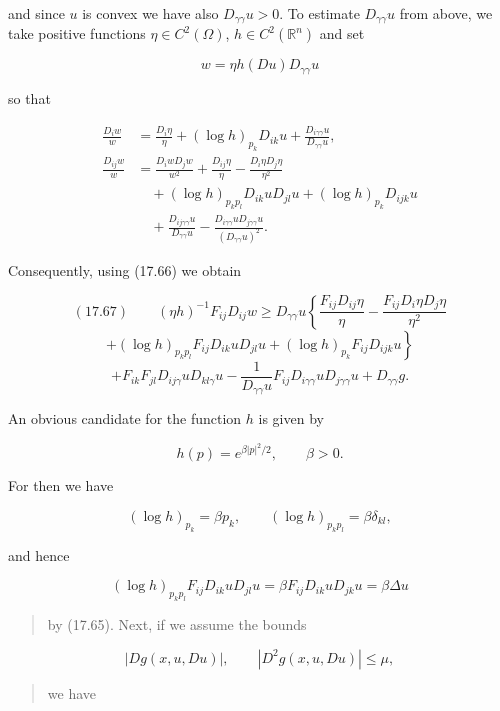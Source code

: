 and since $u$ is convex we have also $D_{\gamma\gamma}u > 0$. To estimate $D_{\gamma\gamma}u$ from above, we take positive functions $\eta\in C^2(\Omega)$, $h\in C^2(\mathbb{R}^n)$ and set

\[
w=\eta h(Du)D_{\gamma\gamma}u
\]

so that

\begin{align*}
\frac{D_iw}{w} &= \frac{D_i\eta}{\eta} + (\log h)_{p_k}D_{ik}u + \frac{D_{i\gamma\gamma}u}{D_{\gamma\gamma}u},\\
\frac{D_{ij}w}{w} &= \frac{D_iwD_jw}{w^2} + \frac{D_{ij}\eta}{\eta} - \frac{D_i\eta D_j\eta}{\eta^2}\\
&\quad + (\log h)_{p_kp_l}D_{ik}uD_{jl}u + (\log h)_{p_k}D_{ijk}u\\
&\quad + \frac{D_{ij\gamma\gamma}u}{D_{\gamma\gamma}u} - \frac{D_{i\gamma\gamma}uD_{j\gamma\gamma}u}{(D_{\gamma\gamma}u)^2}.
\end{align*}

Consequently, using (17.66) we obtain

\begin{equation}
(17.67)\qquad (\eta h)^{-1}F_{ij}D_{ij}w \ge D_{\gamma\gamma}u\left\{\frac{F_{ij}D_{ij}\eta}{\eta} - \frac{F_{ij}D_i\eta D_j\eta}{\eta^2}\right.
\end{equation}
\[
\left.
+ (\log h)_{p_kp_l}F_{ij}D_{ik}uD_{jl}u + (\log h)_{p_k}F_{ij}D_{ijk}u\right\}
\]
\[
+ F_{ik}F_{jl}D_{ij\gamma}uD_{kl\gamma}u - \frac{1}{D_{\gamma\gamma}u}F_{ij}D_{i\gamma\gamma}uD_{j\gamma\gamma}u + D_{\gamma\gamma}g.
\]

An obvious candidate for the function $h$ is given by

\[
h(p)=e^{\beta|p|^2/2},\qquad \beta>0.
\]

For then we have

\[
(\log h)_{p_k}=\beta p_k,\qquad (\log h)_{p_kp_l}=\beta\delta_{kl},
\]

and hence

\[
(\log h)_{p_kp_l}F_{ij}D_{ik}uD_{jl}u = \beta F_{ij}D_{ik}uD_{jk}u = \beta\Delta u
\]


\begin{quote}
by (17.65). Next, if we assume the bounds
\end{quote}

\[
\tag{17.68}
|Dg(x,u,Du)|,\qquad |D^2g(x,u,Du)|\le \mu,
\]

\begin{quote}
we have
\end{quote}

